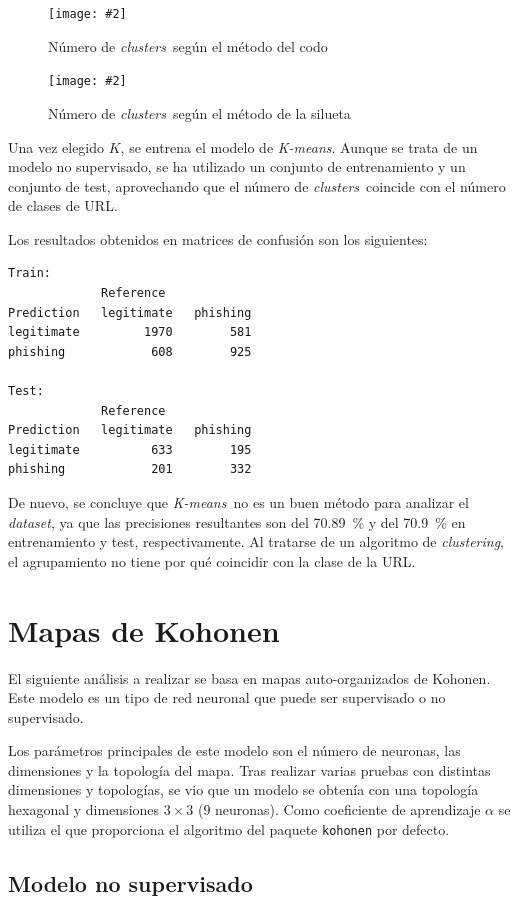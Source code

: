 \documentclass[12pt, a4paper]{article}
\renewcommand{\textit}{\textsl}
\newcommand{\figcaption}[4][H]{
  \begin{figure}[#1]
    \centering
    \texttt{[image: \#2]}
    \caption{#3}
    \label{fig:#2}
  \end{figure}
}
\newcommand*{\clusters}{\textit{clusters}}
\newcommand*{\clustering}{\textit{clustering}}
\newcommand*{\dataset}{\textit{dataset}}
\newcommand*{\kmeans}{\textit{K-means}}
\begin{document}
      \figcaption{elbow.png}{Número de \clusters\ según el método del codo}{1}

      \figcaption{silhouette.png}{Número de \clusters\ según el método de la silueta}{1}

      \newpage

      Una vez elegido $K$, se entrena el modelo de \kmeans. Aunque se trata de un modelo no supervisado, se ha utilizado un conjunto de entrenamiento y un conjunto de test, aprovechando que el número de \clusters\ coincide con el número de clases de URL.

      Los resultados obtenidos en matrices de confusión son los siguientes:

      \begin{verbatim}
Train:
             Reference
Prediction   legitimate   phishing
legitimate         1970        581
phishing            608        925

Test:
             Reference
Prediction   legitimate   phishing
legitimate          633        195
phishing            201        332
      \end{verbatim}

      De nuevo, se concluye que \kmeans\ no es un buen método para analizar el \dataset, ya que las precisiones resultantes son del \SI{70.89}{\percent} y del \SI{70.9}{\percent} en entrenamiento y test, respectivamente. Al tratarse de un algoritmo de \clustering, el agrupamiento no tiene por qué coincidir con la clase de la URL.

  \section{Mapas de Kohonen}

    El siguiente análisis a realizar se basa en mapas auto-organizados de Kohonen. Este modelo es un tipo de red neuronal que puede ser supervisado o no supervisado.

    Los parámetros principales de este modelo son el número de neuronas, las dimensiones y la topología del mapa. Tras realizar varias pruebas con distintas dimensiones y topologías, se vio que un modelo se obtenía con una topología hexagonal y dimensiones $3 \times 3$ ($9$ neuronas). Como coeficiente de aprendizaje $\alpha$ se utiliza el que proporciona el algoritmo del paquete \texttt{kohonen} por defecto.

    \subsection{Modelo no supervisado}
\end{document}
